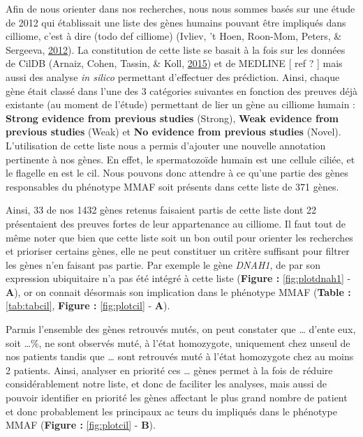 \documentclass[12pt,twoside]{reedthesis}
\theoremstyle{definition}
\theoremstyle{definition}
\theoremstyle{remark}
\begin{document}
  \newpage
  
  Afin de nous orienter dans nos recherches, nous nous sommes basés sur
  une étude de 2012 qui établissait une liste des gènes humains pouvant
  être impliqués dans cilliome, c'est à dire (todo def cilliome) (Ivliev,
  't Hoen, Roon-Mom, Peters, \& Sergeeva,
  \protect\hyperlink{ref-Ivliev2012}{2012}). La constitution de cette
  liste se basait à la fois sur les données de CilDB (Arnaiz, Cohen,
  Tassin, \& Koll, \protect\hyperlink{ref-Arnaiz2015}{2015}) et de MEDLINE
  {[} ref ? {]} mais aussi des analyse \emph{in silico} permettant
  d'effectuer des prédiction. Ainsi, chaque gène était classé dans l'une
  des 3 catégories suivantes en fonction des preuves déjà existante (au
  moment de l'étude) permettant de lier un gène au cilliome humain :
  \textbf{Strong evidence from previous studies} (Strong), \textbf{Weak
  evidence from previous studies} (Weak) et \textbf{No evidence from
  previous studies} (Novel). L'utilisation de cette liste nous a permis
  d'ajouter une nouvelle annotation pertinente à nos gènes. En effet, le
  spermatozoïde humain est une cellule ciliée, et le flagelle en est le
  cil. Nous pouvons donc attendre à ce qu'une partie des gènes
  responsables du phénotype MMAF soit présents dans cette liste de 371
  gènes.
  
  Ainsi, 33 de nos 1432 gènes retenus faisaient partis de cette liste dont
  22 présentaient des preuves fortes de leur appartenance au cilliome. Il
  faut tout de même noter que bien que cette liste soit un bon outil pour
  orienter les recherches et prioriser certains gènes, elle ne peut
  constituer un critère suffisant pour filtrer les gènes n'en faisant pas
  partie. Par exemple le gène \emph{DNAH1}, de par son expression
  ubiquitaire n'a pas été intégré à cette liste (\textbf{Figure :
  }\ref{fig:plotdnah1} - \textbf{A}), or on connait désormais son
  implication dans le phénotype MMAF (\textbf{Table :} \ref{tab:tabcil},
  \textbf{Figure : }\ref{fig:plotcil} - \textbf{A}).
  
  Parmis l'ensemble des gènes retrouvés mutés, on peut constater que
  \ldots{} d'ente eux, soit \ldots{}\%, ne sont observés muté, à l'état
  homozygote, uniquement chez unseul de nos patients tandis que \ldots{}
  sont retrouvés muté à l'état homozygote chez au moins 2 patients. Ainsi,
  analyser en priorité ces \ldots{} gènes permet à la fois de réduire
  considérablement notre liste, et donc de faciliter les analyses, mais
  aussi de pouvoir identifier en priorité les gènes affectant le plus
  grand nombre de patient et donc probablement les principaux ac teurs du
  impliqués dans le phénotype MMAF (\textbf{Figure : }\ref{fig:plotcil} -
  \textbf{B}).
  
\end{document}
